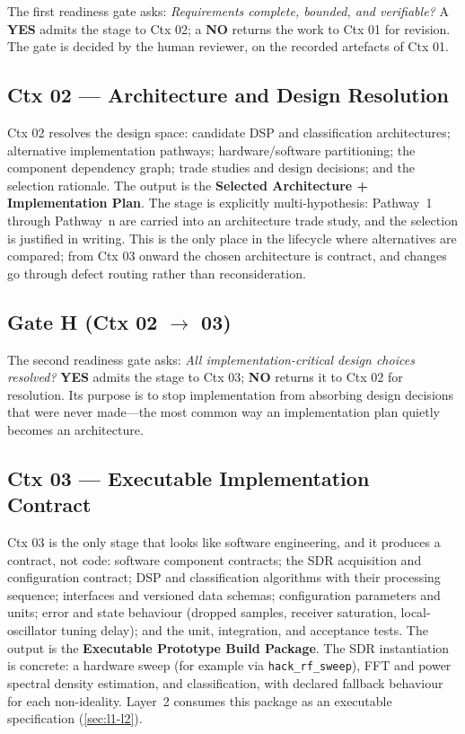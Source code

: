 \documentclass[11pt,a4paper]{article}
\begin{document}
The first readiness gate asks: \emph{Requirements complete, bounded, and verifiable?} A
\textbf{YES} admits the stage to Ctx 02; a \textbf{NO} returns the work to Ctx 01 for revision.
The gate is decided by the human reviewer, on the recorded artefacts of Ctx 01.

\subsection{Ctx 02 --- Architecture and Design Resolution}
\label{sec:ctx02}

Ctx 02 resolves the design space: candidate DSP and classification architectures; alternative
implementation pathways; hardware/software partitioning; the component dependency graph; trade
studies and design decisions; and the selection rationale. The output is the \textbf{Selected
Architecture + Implementation Plan}. The stage is explicitly multi-hypothesis: Pathway~1 through
Pathway~n are carried into an architecture trade study, and the selection is justified in writing.
This is the only place in the lifecycle where alternatives are compared; from Ctx 03 onward the
chosen architecture is contract, and changes go through defect routing rather than reconsideration.

\subsection{Gate H (Ctx 02 $\rightarrow$ 03)}
\label{sec:gate-h2}

The second readiness gate asks: \emph{All implementation-critical design choices resolved?}
\textbf{YES} admits the stage to Ctx 03; \textbf{NO} returns it to Ctx 02 for resolution. Its
purpose is to stop implementation from absorbing design decisions that were never made---the
most common way an implementation plan quietly becomes an architecture.

\subsection{Ctx 03 --- Executable Implementation Contract}
\label{sec:ctx03}

Ctx 03 is the only stage that looks like software engineering, and it produces a contract, not
code: software component contracts; the SDR acquisition and configuration contract; DSP and
classification algorithms with their processing sequence; interfaces and versioned data schemas;
configuration parameters and units; error and state behaviour (dropped samples, receiver
saturation, local-oscillator tuning delay); and the unit, integration, and acceptance tests. The
output is the \textbf{Executable Prototype Build Package}. The SDR instantiation is concrete: a
hardware sweep (for example via \texttt{hack\_rf\_sweep}), FFT and power spectral density
estimation, and classification, with declared fallback behaviour for each non-ideality. Layer~2
consumes this package as an executable specification (\cref{sec:l1-l2}).
\end{document}
